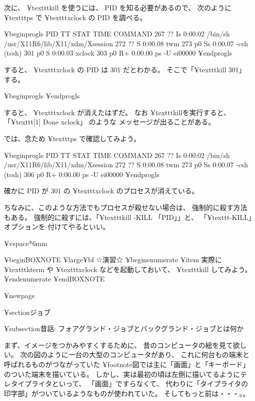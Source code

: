 次に、 ¥texttt{kill} を使うには、 PID を知る必要があるので、
次のように ¥texttt{ps} で ¥texttt{xclock} の PID を調べる。

¥begin{progls}
  PID  TT  STAT      TIME COMMAND
  267  ??  Is     0:00.02 /bin/sh /usr/X11R6/lib/X11/xdm/Xsession
  272  ??  S      0:00.08 twm
  273  p0  Ss     0:00.07 -csh (tcsh)
  301  p0  S      0:00.03 xclock
  303  p0  R+     0:00.00 ps -U ei00000
%
¥end{progls}

すると、 ¥texttt{xclock} の PID は 301 だとわかる。
そこで「¥texttt{kill 301}」する。

¥begin{progls}
%
¥end{progls}

すると、 ¥texttt{xclock} が消えたはずだ。
なお ¥texttt{kill}を実行すると、
「¥texttt{[1]    Done                          xclock}」
のような
メッセージが出ることがある。

では、念ため ¥texttt{ps} で確認してみよう。

¥begin{progls}
  PID  TT  STAT      TIME COMMAND
  267  ??  Is     0:00.02 /bin/sh /usr/X11R6/lib/X11/xdm/Xsession
  272  ??  S      0:00.08 twm
  273  p0  Ss     0:00.07 -csh (tcsh)
  306  p0  R+     0:00.00 ps -U ei00000
¥end{progls}

確かに PID が 301 の ¥texttt{xclock} のプロセスが消えている。

ちなみに、このような方法でもプロセスが殺せない場合は、
強制的に殺す方法もある。
強制的に殺すには、「¥texttt{kill -KILL 「PID」}」と、
「¥texttt{-KILL}」オプションを
付けてやるといい。

¥vspace*{6mm}

¥begin{BOXNOTE}
{¥large¥bf ☆演習☆}
¥begin{enumerate}
¥item 実際に ¥texttt{kterm} や ¥texttt{xclock} などを起動しておいて、
 ¥texttt{kill} してみよう。
¥end{enumerate}
¥end{BOXNOTE}

¥newpage

¥section{ジョブ}

¥subsection{昔話: フォアグランド・ジョブとバックグランド・ジョブとは何か}

まず、イメージをつかみやすくするために、
昔のコンピュータの絵を見て欲しい。
次の図のように一台の大型のコンピュータがあり、
これに何台もの端末と呼ばれるものがつながっていた
¥footnote{図では主に「画面」と「キーボード」のついた端末を描いている。
しかし、実は最初の頃は左側に描いてるようにテレタイプライタといって、
「画面」ですらなくて、
代わりに「タイプライタの印字部」がついているようなものが使われていた。
そしてもっと前は・・・。}。

